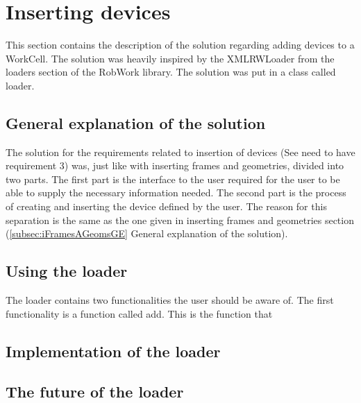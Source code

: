\section{Inserting devices}
This section contains the description of the solution regarding adding devices to a WorkCell. The solution was heavily inspired by the XMLRWLoader from the loaders section of the RobWork library. The solution was put in a class called loader.

\subsection{General explanation of the solution}
The solution for the requirements related to insertion of devices (See need to have requirement 3) was, just like with inserting frames and geometries, divided into two parts. The first part is the interface to the user required for the user to be able to supply the necessary information needed. The second part is the process of creating and inserting the device defined by the user. The reason for this separation is the same as the one given in inserting frames and geometries section (\ref{subsec:iFramesAGeomsGE} General explanation of the solution).

\subsection{Using the loader}
The loader contains two functionalities the user should be aware of. The first functionality is a function called add. This is the function that 

\subsection{Implementation of the loader}


\subsection{The future of the loader}